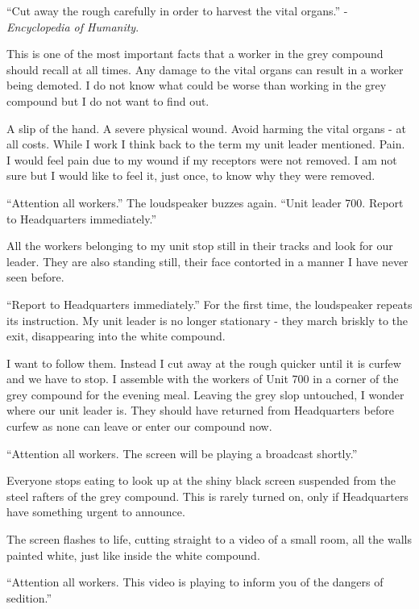 \hspace{1.5em}
\parbox{0.95\textwidth}{
“Cut away the rough carefully in order to harvest the vital organs.” - \textit{Encyclopedia of Humanity}.
}

This is one of the most important facts that a worker in the grey compound should recall at all times. Any damage to the vital organs can result in a worker being demoted. I do not know what could be worse than working in the grey compound but I do not want to find out. 

A slip of the hand. A severe physical wound. Avoid harming the vital organs - at all costs. 
While I work I think back to the term my unit leader mentioned. Pain. I would feel pain due to my wound if my receptors were not removed. I am not sure but I would like to feel it, just once, to know why they were removed. 

“Attention all workers.” The loudspeaker buzzes again. “Unit leader 700. Report to Headquarters immediately.”

All the workers belonging to my unit stop still in their tracks and look for our leader. They are also standing still, their face contorted in a manner I have never seen before. 

“Report to Headquarters immediately.” For the first time, the loudspeaker repeats its instruction. My unit leader is no longer stationary - they march briskly to the exit, disappearing into the white compound. 

I want to follow them. Instead I cut away at the rough quicker until it is curfew and we have to stop. I assemble with the workers of Unit 700 in a corner of the grey compound for the evening meal. Leaving the grey slop untouched, I wonder where our unit leader is. They should have returned from Headquarters before curfew as none can leave or enter our compound now.

“Attention all workers. The screen will be playing a broadcast shortly.” 

Everyone stops eating to look up at the shiny black screen suspended from the steel rafters of the grey compound. This is rarely turned on, only if Headquarters have something urgent to announce.

The screen flashes to life, cutting straight to a video of a small room, all the walls painted white, just like inside the white compound.

“Attention all workers. This video is playing to inform you of the dangers of sedition.”
\vspace{1em}

